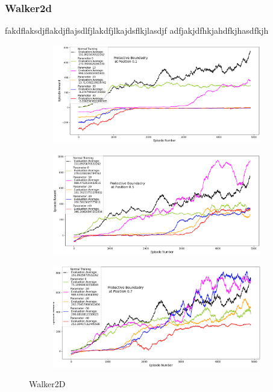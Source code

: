 \documentclass[journal]{IEEEtran}
\begin{document}
\subsubsection{Walker2d}
fakdflaksdjflakdjflajsdlfjlakdfjlkajdsflkjlasdjf
adfjakjdfhkjahdfkjhasdfkjh
\begin{figure}
    \centering
    \begin{subfigure}[b]{0.5\textwidth}
      \centering
      \includegraphics[width=\textwidth]{Walker_with_Boundary_at_0.1.png}
    \end{subfigure}
    \vspace*{0.0mm}
    \begin{subfigure}[b]{0.5\textwidth}
      \centering
      \includegraphics[width=\textwidth]{Walker_with_Boundary_at_0.5.png}
    \end{subfigure}
    \vspace*{0.0mm}
    \begin{subfigure}[b]{0.5\textwidth}
      \centering
      \includegraphics[width=\textwidth]{Walker_with_Boundary_at_0.7.png}
    \end{subfigure}
    \caption{Walker2D}
    \label{fig:Walker}
\end{figure}
\end{document}
